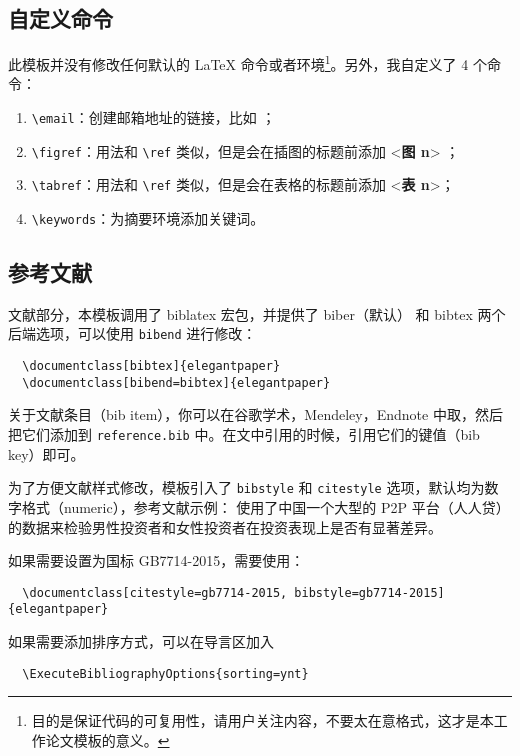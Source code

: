 \documentclass[lang=cn,11pt,a4paper]{elegantpaper}
\begin{document}
\subsection{自定义命令}
此模板并没有修改任何默认的 \LaTeX{} 命令或者环境\footnote{目的是保证代码的可复用性，请用户关注内容，不要太在意格式，这才是本工作论文模板的意义。}。另外，我自定义了 4 个命令：
\begin{enumerate}
  \item \lstinline{\email}：创建邮箱地址的链接，比如 ；
  \item \lstinline{\figref}：用法和 \lstinline{\ref} 类似，但是会在插图的标题前添加 <\textbf{图 n}> ；
  \item \lstinline{\tabref}：用法和 \lstinline{\ref} 类似，但是会在表格的标题前添加 <\textbf{表 n}>；
  \item \lstinline{\keywords}：为摘要环境添加关键词。
\end{enumerate}

\subsection{参考文献}

文献部分，本模板调用了 biblatex 宏包，并提供了 biber（默认） 和 bibtex 两个后端选项，可以使用 \lstinline{bibend} 进行修改：

\begin{lstlisting}
  \documentclass[bibtex]{elegantpaper}
  \documentclass[bibend=bibtex]{elegantpaper}
\end{lstlisting}

关于文献条目（bib item），你可以在谷歌学术，Mendeley，Endnote 中取，然后把它们添加到 \lstinline{reference.bib} 中。在文中引用的时候，引用它们的键值（bib key）即可。

为了方便文献样式修改，模板引入了 \lstinline{bibstyle} 和 \lstinline{citestyle} 选项，默认均为数字格式（numeric），参考文献示例：\cite{cn1,en2,en3} 使用了中国一个大型的 P2P 平台（人人贷）的数据来检验男性投资者和女性投资者在投资表现上是否有显著差异。

如果需要设置为国标 GB7714-2015，需要使用：
\begin{lstlisting}
  \documentclass[citestyle=gb7714-2015, bibstyle=gb7714-2015]{elegantpaper} 
\end{lstlisting}

如果需要添加排序方式，可以在导言区加入
\begin{lstlisting}
  \ExecuteBibliographyOptions{sorting=ynt}
\end{lstlisting}
\end{document}
